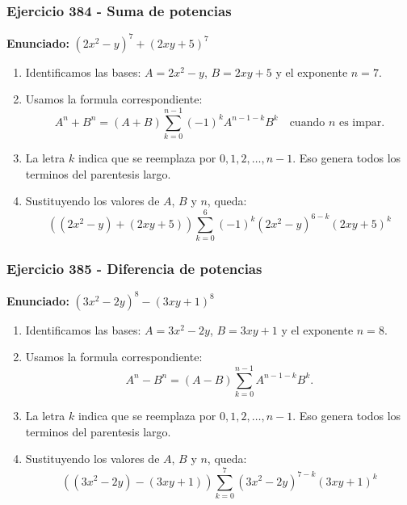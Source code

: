 \documentclass[11pt,a4paper]{article}
\begin{document}
\subsubsection*{Ejercicio 384 - Suma de potencias}
\textbf{Enunciado:} $ \left(2 x^{2} - y\right)^{7}+\left(2 x y + 5\right)^{7} $\par
\begin{enumerate}[leftmargin=2em]
\item Identificamos las bases: \(A=2 x^{2} - y\), \(B=2 x y + 5\) y el exponente \(n=7\).
\item Usamos la formula correspondiente: \[A^n+B^n=(A+B)\sum_{k=0}^{n-1}(-1)^kA^{n-1-k}B^k\quad\text{cuando }n\text{ es impar}.\]
\item La letra \(k\) indica que se reemplaza por \(0,1,2,\ldots,n-1\). Eso genera todos los terminos del parentesis largo.
\item Sustituyendo los valores de \(A\), \(B\) y \(n\), queda: \[\boxed{\left(\left(2 x^{2} - y\right)+\left(2 x y + 5\right)\right)\sum_{k=0}^{6}(-1)^k\left(2 x^{2} - y\right)^{6-k}\left(2 x y + 5\right)^k}\]
\end{enumerate}

\vspace{0.2cm}
\subsubsection*{Ejercicio 385 - Diferencia de potencias}
\textbf{Enunciado:} $ \left(3 x^{2} - 2 y\right)^{8}-\left(3 x y + 1\right)^{8} $\par
\begin{enumerate}[leftmargin=2em]
\item Identificamos las bases: \(A=3 x^{2} - 2 y\), \(B=3 x y + 1\) y el exponente \(n=8\).
\item Usamos la formula correspondiente: \[A^n-B^n=(A-B)\sum_{k=0}^{n-1}A^{n-1-k}B^k.\]
\item La letra \(k\) indica que se reemplaza por \(0,1,2,\ldots,n-1\). Eso genera todos los terminos del parentesis largo.
\item Sustituyendo los valores de \(A\), \(B\) y \(n\), queda: \[\boxed{\left(\left(3 x^{2} - 2 y\right)-\left(3 x y + 1\right)\right)\sum_{k=0}^{7}\left(3 x^{2} - 2 y\right)^{7-k}\left(3 x y + 1\right)^k}\]
\end{enumerate}

\vspace{0.2cm}
\end{document}

